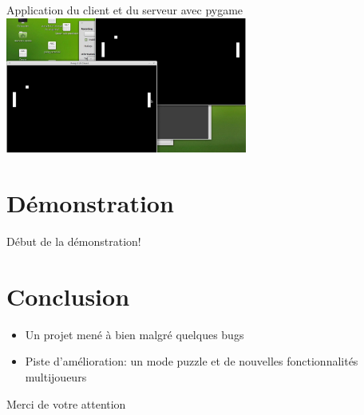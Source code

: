 \documentclass{beamer}
\begin{document}
	\begin{frame}{Application du client et du serveur avec pygame}
		\centering
		\includegraphics[width=300px]{images/multi_pygame.jpg}


	\end{frame}
	
\section{Démonstration}

	\begin{frame}
		 Début de la démonstration!
	\end{frame}
	
\section{Conclusion}

	\begin{frame}
		\begin{itemize}
			\item Un projet mené à bien malgré quelques bugs
			\newline
			
			\item Piste d'amélioration: un mode puzzle et de nouvelles fonctionnalités multijoueurs
		\end{itemize}
	\end{frame}
	
	\begin{frame}
		Merci de votre attention
	\end{frame}
\end{document}
